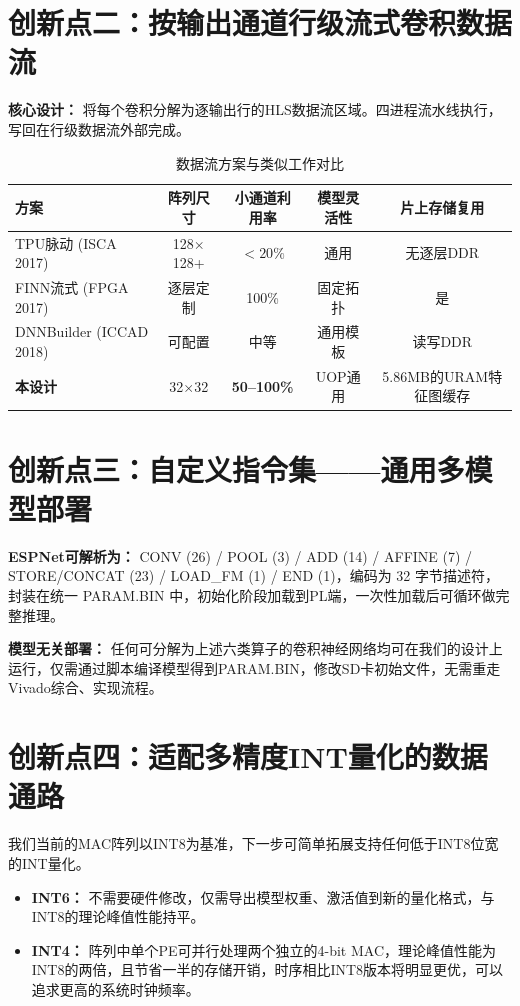 \documentclass[11pt,a4paper]{article}
\begin{document}
\section*{创新点二：按输出通道行级流式卷积数据流}

\textbf{核心设计：} 将每个卷积分解为逐输出行的HLS数据流区域。四进程流水线执行，写回在行级数据流外部完成。

\begin{table}[h]
\centering
\caption{数据流方案与类似工作对比}
\begin{tabular}{@{}lcccc@{}}
\toprule
方案 & 阵列尺寸 & 小通道利用率 & 模型灵活性 & 片上存储复用 \\
\midrule
TPU脉动 (ISCA 2017) & 128$\times$128+ & $<20\%$ & 通用 & 无逐层DDR \\
FINN流式 (FPGA 2017) & 逐层定制 & 100\% & 固定拓扑 & 是 \\
DNNBuilder (ICCAD 2018) & 可配置 & 中等 & 通用模板 & 读写DDR \\
\textbf{本设计} & 32$\times$32 & \textbf{50--100\%} & UOP通用 & 5.86MB的URAM特征图缓存 \\
\bottomrule
\end{tabular}
\end{table}


\section*{创新点三：自定义指令集——通用多模型部署}

\textbf{ESPNet可解析为：} CONV (26) / POOL (3) / ADD (14) / AFFINE (7) / STORE/CONCAT (23) / LOAD\_FM (1) / END (1)，编码为 32 字节描述符，封装在统一 PARAM.BIN 中，初始化阶段加载到PL端，一次性加载后可循环做完整推理。

\textbf{模型无关部署：} 任何可分解为上述六类算子的卷积神经网络均可在我们的设计上运行，仅需通过脚本编译模型得到PARAM.BIN，修改SD卡初始文件，无需重走Vivado综合、实现流程。


\section*{创新点四：适配多精度INT量化的数据通路}

我们当前的MAC阵列以INT8为基准，下一步可简单拓展支持任何低于INT8位宽的INT量化。
\begin{itemize}
\item \textbf{INT6：} 不需要硬件修改，仅需导出模型权重、激活值到新的量化格式，与INT8的理论峰值性能持平。
\item \textbf{INT4：} 阵列中单个PE可并行处理两个独立的4-bit MAC，理论峰值性能为INT8的两倍，且节省一半的存储开销，时序相比INT8版本将明显更优，可以追求更高的系统时钟频率。
\end{itemize}
\end{document}
